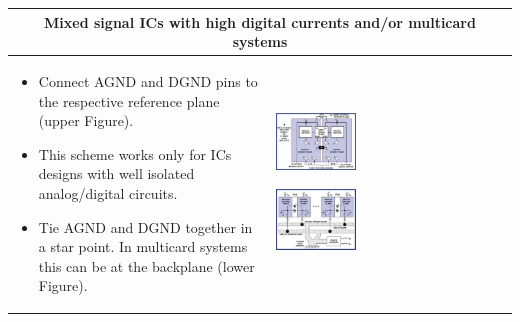 \begin{table}[h!]
\begin{tabular}{|m{}|m{}|}
					\\	
					\hline
						\multicolumn{2}{c}{\textbf{Mixed signal ICs with high digital currents and/or multicard systems}}	
					\\
					\hline
						\begin{itemize}
							\item Connect AGND and DGND pins to the respective reference plane (upper Figure). 
							\item This scheme works only for ICs designs with well isolated analog/digital circuits. 
							\item Tie AGND and DGND together in a star point. In multicard systems this can be at the backplane (lower Figure).
						\end{itemize}
					& 
						 \begin{center}\includegraphics[width=0.35\textwidth]{images/MixedSignal4.png}\end{center}  
						 \begin{center}\includegraphics[width=0.35\textwidth]{images/MixedSignal5.png}\end{center}	
					\\
					\hline
					\end{tabular}
				\end{table}	
				
				
				
